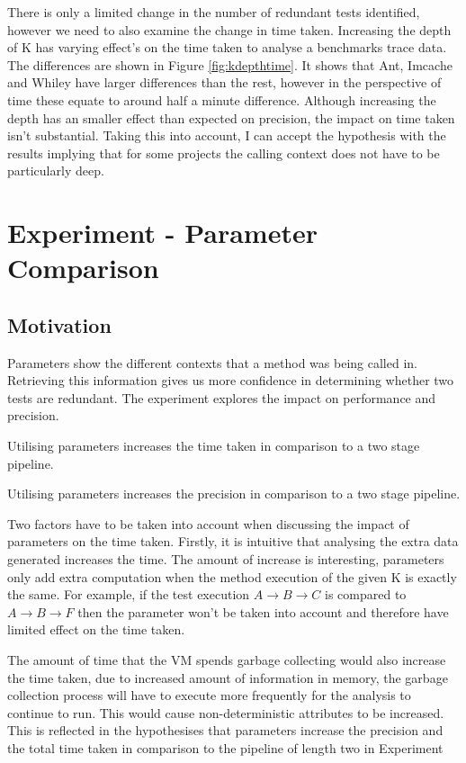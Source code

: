 There is only a limited change in the number of redundant tests identified, however we need to also examine the change in time taken. Increasing the depth of K has varying effect's on the time taken to analyse a benchmarks trace data. The differences are shown in Figure \ref{fig:kdepthtime}. It shows that Ant, Imcache and Whiley have larger differences than the rest, however in the perspective of time these equate to around half a minute difference. Although increasing the depth has an smaller effect than expected on precision, the impact on time taken isn't substantial. Taking this into account, I can accept the hypothesis with the results implying that for some projects the calling context does not have to be particularly deep. 

\section{Experiment  - Parameter Comparison}
\label{sec:param}

\subsection{Motivation}
Parameters show the different contexts that a method was being called in. Retrieving this information gives us more confidence in determining whether two tests are redundant. The experiment explores the impact on performance and precision.

\begin{hyp}
Utilising parameters increases the time taken in comparison to a two stage pipeline.
\end{hyp}

\begin{hyp}
Utilising parameters increases the precision in comparison to a two stage pipeline.
\end{hyp}

Two factors have to be taken into account when discussing the impact of parameters on the time taken. Firstly, it is intuitive that analysing the extra data generated increases the time. The amount of increase is interesting, parameters only add extra computation when the method execution of the given K is exactly the same. For example, if the test execution $A \rightarrow  B \rightarrow  C$ is compared to $A \rightarrow  B \rightarrow  F$ then the parameter won't be taken into account and therefore have limited effect on the time taken. 

The amount of time that the VM spends garbage collecting would also increase the time taken, due to increased amount of information in memory, the garbage collection process will have to execute more frequently for the analysis to continue to run. This would cause non-deterministic attributes to be increased. This is reflected in the hypothesises that parameters increase the precision and the total time taken in comparison to the pipeline of length two in Experiment 

